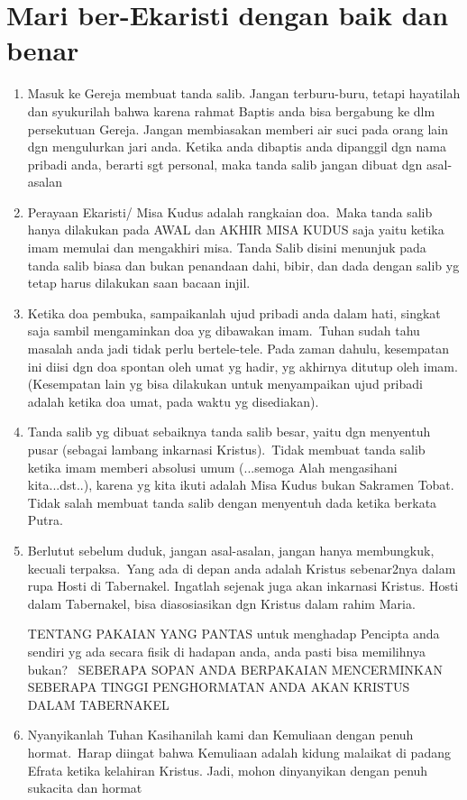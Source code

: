 \section{Mari ber-Ekaristi dengan baik dan benar}
\begin{enumerate}
\item  Masuk ke
Gereja membuat tanda salib. Jangan terburu-buru, tetapi hayatilah dan syukurilah
bahwa karena rahmat Baptis anda bisa bergabung ke dlm persekutuan
Gereja. Jangan membiasakan memberi air suci pada orang lain dgn
mengulurkan jari anda. Ketika anda dibaptis anda dipanggil dgn nama
pribadi anda, berarti sgt personal, maka tanda salib jangan dibuat dgn
asal-asalan
\item Perayaan Ekaristi/ Misa Kudus adalah rangkaian doa.~Maka
tanda salib hanya dilakukan pada AWAL dan AKHIR MISA KUDUS saja yaitu
ketika imam memulai dan mengakhiri misa. Tanda Salib disini menunjuk pada tanda salib biasa dan bukan
penandaan dahi, bibir, dan dada dengan salib yg tetap harus dilakukan
saan bacaan injil. 
\item Ketika doa pembuka, sampaikanlah ujud pribadi
anda dalam hati, singkat saja sambil mengaminkan doa yg dibawakan
imam.~Tuhan sudah tahu masalah anda jadi tidak perlu bertele-tele. Pada
zaman dahulu, kesempatan ini diisi dgn doa spontan oleh umat yg hadir,
yg akhirnya ditutup oleh imam.(Kesempatan lain yg bisa dilakukan untuk
menyampaikan ujud pribadi adalah ketika doa umat, pada waktu yg
disediakan).
\item Tanda salib yg dibuat sebaiknya tanda salib besar,
yaitu dgn menyentuh pusar (sebagai lambang inkarnasi Kristus).~Tidak
membuat tanda salib ketika imam memberi absolusi umum
({\textquotedbl}...semoga Alah mengasihani
kita...dst..{\textquotedbl}), karena yg kita ikuti adalah Misa Kudus
bukan Sakramen Tobat. Tidak salah membuat tanda salib dengan menyentuh
dada ketika berkata {\textquotedbl}Putra{\textquotedbl}.  
\item Berlutut
sebelum duduk, jangan asal-asalan, jangan hanya membungkuk, kecuali
terpaksa.~Yang ada di depan anda adalah Kristus sebenar2nya dalam rupa
Hosti di Tabernakel. Ingatlah sejenak juga akan inkarnasi Kristus.
Hosti dalam Tabernakel, bisa diasosiasikan dgn Kristus dalam rahim
Maria. 

TENTANG PAKAIAN YANG PANTAS untuk menghadap Pencipta anda
sendiri yg ada secara fisik di hadapan anda, anda pasti bisa memilihnya
bukan?~ SEBERAPA SOPAN ANDA BERPAKAIAN MENCERMINKAN SEBERAPA TINGGI
PENGHORMATAN ANDA AKAN KRISTUS DALAM TABERNAKEL~  
\item Nyanyikanlah Tuhan
Kasihanilah kami dan Kemuliaan dengan penuh hormat.~Harap diingat bahwa
Kemuliaan adalah kidung malaikat di padang Efrata ketika kelahiran
Kristus. Jadi, mohon dinyanyikan dengan penuh sukacita dan hormat~  


\end{enumerate}
